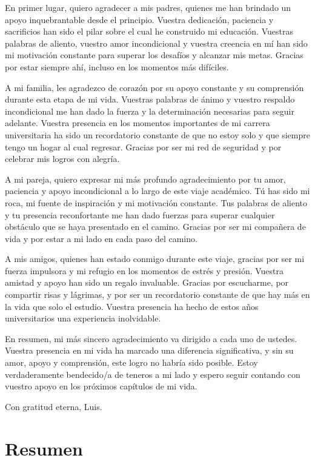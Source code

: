 \documentclass[a4paper, 12pt]{book}
\begin{document}
	En primer lugar, quiero agradecer a mis padres, quienes me han brindado un apoyo inquebrantable desde el principio. Vuestra dedicación, paciencia y sacrificios han sido el pilar sobre el cual he construido mi educación. Vuestras palabras de aliento, vuestro amor incondicional y vuestra creencia en mí han sido mi motivación constante para superar los desafíos y alcanzar mis metas. Gracias por estar siempre ahí, incluso en los momentos más difíciles.
	
	A mi familia, les agradezco de corazón por su apoyo constante y su comprensión durante esta etapa de mi vida. Vuestras palabras de ánimo y vuestro respaldo incondicional me han dado la fuerza y la determinación necesarias para seguir adelante. Vuestra presencia en los momentos importantes de mi carrera universitaria ha sido un recordatorio constante de que no estoy solo y que siempre tengo un hogar al cual regresar. Gracias por ser mi red de seguridad y por celebrar mis logros con alegría.
	
	A mi pareja, quiero expresar mi más profundo agradecimiento por tu amor, paciencia y apoyo incondicional a lo largo de este viaje académico. Tú has sido mi roca, mi fuente de inspiración y mi motivación constante. Tus palabras de aliento y tu presencia reconfortante me han dado fuerzas para superar cualquier obstáculo que se haya presentado en el camino. Gracias por ser mi compañera de vida y por estar a mi lado en cada paso del camino.
	
	A mis amigos, quienes han estado conmigo durante este viaje, gracias por ser mi fuerza impulsora y mi refugio en los momentos de estrés y presión. Vuestra amistad y apoyo han sido un regalo invaluable. Gracias por escucharme, por compartir risas y lágrimas, y por ser un recordatorio constante de que hay más en la vida que solo el estudio. Vuestra presencia ha hecho de estos años universitarios una experiencia inolvidable.
	
	En resumen, mi más sincero agradecimiento va dirigido a cada uno de ustedes. Vuestra presencia en mi vida ha marcado una diferencia significativa, y sin su amor, apoyo y comprensión, este logro no habría sido posible. Estoy verdaderamente bendecido/a de teneros a mi lado y espero seguir contando con vuestro apoyo en los próximos capítulos de mi vida.
	
	Con gratitud eterna,
	Luis.
	
	
	\chapter*{Resumen}
	
\end{document}
